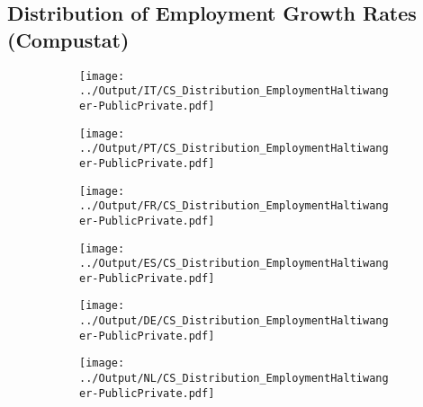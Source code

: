 \documentclass[12pt,notitlepage]{article}
\begin{document}
\subsection{Distribution of Employment Growth Rates (Compustat)}
\begin{figure}[!htpb]
\centering
\begin{subfigure}{.49\textwidth}
    \centering
 \texttt{[image: ../Output/IT/CS\_Distribution\_EmploymentHaltiwanger-PublicPrivate.pdf]}
\end{subfigure}%
\begin{subfigure}{.49\textwidth}
    \centering
 \texttt{[image: ../Output/PT/CS\_Distribution\_EmploymentHaltiwanger-PublicPrivate.pdf]}
\end{subfigure}
\begin{subfigure}{.49\textwidth}
    \centering
 \texttt{[image: ../Output/FR/CS\_Distribution\_EmploymentHaltiwanger-PublicPrivate.pdf]}
\end{subfigure}%
\begin{subfigure}{.49\textwidth}
    \centering
 \texttt{[image: ../Output/ES/CS\_Distribution\_EmploymentHaltiwanger-PublicPrivate.pdf]}
\end{subfigure}
\begin{subfigure}{.49\textwidth}
    \centering
 \texttt{[image: ../Output/DE/CS\_Distribution\_EmploymentHaltiwanger-PublicPrivate.pdf]}
\end{subfigure}
\begin{subfigure}{.49\textwidth}
    \centering
 \texttt{[image: ../Output/NL/CS\_Distribution\_EmploymentHaltiwanger-PublicPrivate.pdf]}
\end{subfigure}
\end{figure}

\clearpage
\end{document}
